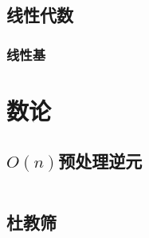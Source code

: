 \documentclass[a4paper]{article}
\begin{document}
\begin{multicols}{2}
			\subsection{线性代数}






				\subsubsection{线性基}








		\section{数论}

			\subsection{$O(n)$预处理逆元}
				\inputminted{cpp}{../src/数论/O(n)求逆元.cpp}

			\subsection{杜教筛}
				\inputminted{cpp}{../src/数论/杜教筛.cpp}
			

\end{multicols}
\end{document}
